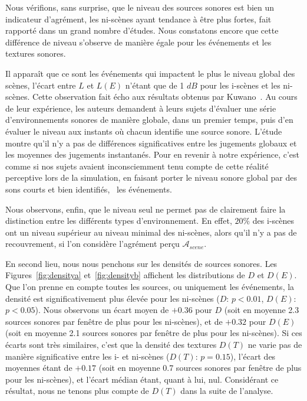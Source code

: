 Nous vérifions, sans surprise, que le niveau des sources sonores est bien un indicateur d'agrément, les ni-scènes ayant tendance à être plus fortes, fait rapporté dans un grand nombre d'études. Nous constatons encore que cette différence de niveau s'observe de manière égale pour les événements et les textures sonores. 


Il apparaît que ce sont les événements qui impactent le plus le niveau global des scènes, l'écart entre $L$ et $L(E)$ n'étant que de 1 $dB$ pour les i-scènes et les ni-scènes. Cette observation fait écho aux résultats obtenus par Kuwano~\al \citep{kuwano_memory_2003}. Au cours de leur expérience, les auteurs demandent à leurs sujets d'évaluer une série d'environnements sonores de manière globale, dans un premier temps, puis d'en évaluer le niveau aux instants où chacun identifie une source sonore. L'étude montre qu'il n'y a pas de différences significatives entre les jugements globaux et les moyennes des jugements instantanés. Pour en revenir à notre expérience, c'est comme si nos sujets avaient inconsciemment tenu compte de cette réalité perceptive lors de la simulation, en faisant porter le niveau sonore global par des sons courts et bien identifiés, \ie~les événements.

Nous observons, enfin, que le niveau seul ne permet pas de clairement faire la distinction entre les différents types d'environnement. En effet, $20\%$ des i-scènes ont un niveau supérieur au niveau minimal des ni-scènes, alors qu'il n'y a pas de recouvrement, si l'on considère l'agrément perçu $\mathcal{A}_{scene}$.

En second lieu, nous nous penchons sur les densités de sources sonores. Les Figures~\ref{fig:densitya} et~\ref{fig:densityb} affichent les distributions de $D$ et $D(E)$. Que l'on prenne en compte toutes les sources, ou uniquement les événements, la densité est significativement plus élevée pour les ni-scènes ($D$: $p<0.01$, $D(E)$: $p<0.05$). Nous observons un écart moyen de $+0.36$ pour $D$ (soit en moyenne 2.3 sources sonores par fenêtre de plus pour les ni-scènes), et de $+0.32$ pour $D(E)$ (soit en moyenne 2.1 sources sonores par fenêtre de plus pour les ni-scènes). Si ces écarts sont très similaires, c'est que la densité des textures $D(T)$ ne varie pas de manière significative entre les i- et ni-scènes ($D(T)$: $p=0.15$), l'écart des moyennes étant de $+0.17$ (soit en moyenne 0.7 sources sonores par fenêtre de plus pour les ni-scènes), et l'écart médian étant, quant à lui, nul. Considérant ce résultat, nous ne tenons plus compte de $D(T)$ dans la suite de l'analyse.

